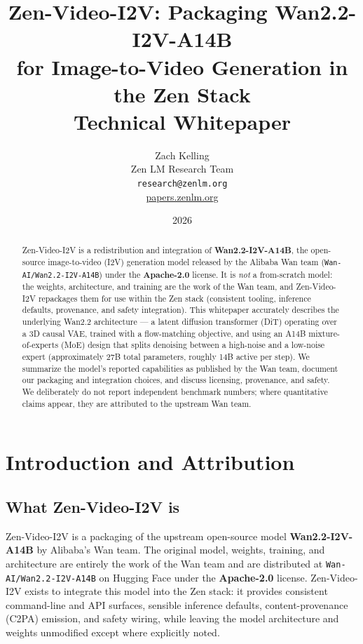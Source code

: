 \documentclass[11pt,a4paper]{article}
\title{\textbf{Zen-Video-I2V: Packaging Wan2.2-I2V-A14B\\
for Image-to-Video Generation in the Zen Stack}\\[0.5em]
\large Technical Whitepaper}
\author{Zach Kelling \\ Zen LM Research Team\\
\texttt{research@zenlm.org}\\
\href{https://papers.zenlm.org}{papers.zenlm.org}}
\date{2026}
\begin{document}
\maketitle

\begin{abstract}
Zen-Video-I2V is a redistribution and integration of \textbf{Wan2.2-I2V-A14B}, the open-source image-to-video (I2V) generation model released by the Alibaba Wan team (\texttt{Wan-AI/Wan2.2-I2V-A14B}) under the \textbf{Apache-2.0} license. It is \emph{not} a from-scratch model: the weights, architecture, and training are the work of the Wan team, and Zen-Video-I2V repackages them for use within the Zen stack (consistent tooling, inference defaults, provenance, and safety integration). This whitepaper accurately describes the underlying Wan2.2 architecture --- a latent diffusion transformer (DiT) operating over a 3D causal VAE, trained with a flow-matching objective, and using an A14B mixture-of-experts (MoE) design that splits denoising between a high-noise and a low-noise expert (approximately 27B total parameters, roughly 14B active per step). We summarize the model's reported capabilities as published by the Wan team, document our packaging and integration choices, and discuss licensing, provenance, and safety. We deliberately do not report independent benchmark numbers; where quantitative claims appear, they are attributed to the upstream Wan team.
\end{abstract}

\tableofcontents
\newpage

\section{Introduction and Attribution}

\subsection{What Zen-Video-I2V is}

Zen-Video-I2V is a packaging of the upstream open-source model \textbf{Wan2.2-I2V-A14B} by Alibaba's Wan team. The original model, weights, training, and architecture are entirely the work of the Wan team and are distributed at \texttt{Wan-AI/Wan2.2-I2V-A14B} on Hugging Face under the \textbf{Apache-2.0} license. Zen-Video-I2V exists to integrate this model into the Zen stack: it provides consistent command-line and API surfaces, sensible inference defaults, content-provenance (C2PA) emission, and safety wiring, while leaving the model architecture and weights unmodified except where explicitly noted.
\end{document}
